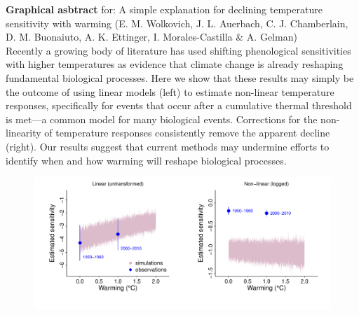 \documentclass[11pt,letter]{article}
\begin{document}
{\bf Graphical asbtract} for: A simple explanation for declining temperature sensitivity with warming (E. M. Wolkovich,  J. L. Auerbach, C. J. Chamberlain, D. M. Buonaiuto, A. K. Ettinger, I. Morales-Castilla \& A. Gelman)\\

Recently a growing body of literature has used shifting phenological sensitivities with higher temperatures as evidence that climate change is already reshaping fundamental biological processes. Here we show that these results may simply be the outcome of using linear models (left) to estimate non-linear temperature responses, specifically for events that occur after a cumulative thermal threshold is met---a common model for many biological events. Corrections for the non-linearity of temperature responses consistently remove the apparent decline (right). Our results suggest that current methods may undermine efforts to identify when and how warming will reshape biological processes.\\

\begin{figure}[h!]
\centering
\noindent \includegraphics[width=1.05\textwidth]{..//analyses/figures/basicsimsandpepalt1.pdf} 
\end{figure}
\end{document}
